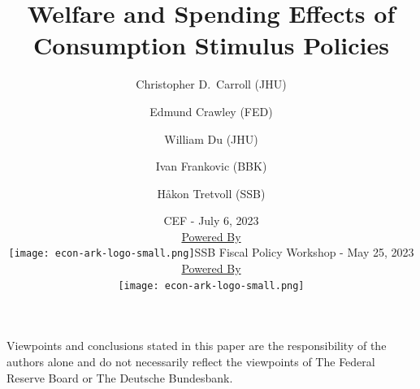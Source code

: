 \documentclass[pdflatex,aspectratio=169]{beamer}
\title[Stimulus]{Welfare and Spending Effects of Consumption Stimulus Policies}
\author{
  Christopher D.\ Carroll (JHU)
  \and
  Edmund Crawley (FED)
  \and
  William Du (JHU)
  \and
  Ivan Frankovic (BBK)
  \and
  H{\aa}kon Tretvoll (SSB)
}
\date[\today]{CEF - July 6, 2023  \\ \medskip \medskip \medskip
        \href{https://econ-ark.org/}{\small Powered By} \\ \texttt{[image: econ-ark-logo-small.png]}}}{}
\date[\today]{SSB Fiscal Policy Workshop - May 25, 2023  \\ \medskip \medskip \medskip 
          \href{https://econ-ark.org/}{\small Powered By} \\ \texttt{[image: econ-ark-logo-small.png]}}}{}
\begin{document}


\begin{frame}[plain]
  \titlepage
  
  \footnotesize{Viewpoints and conclusions stated in this paper are the responsibility of the authors alone
    and do not necessarily reflect the viewpoints of The Federal Reserve Board or The Deutsche Bundesbank.}
\end{frame}




%
\end{document}
